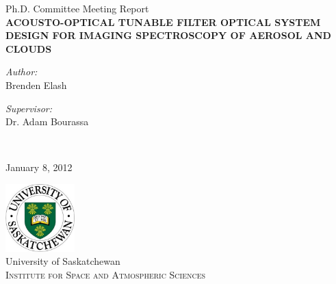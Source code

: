 \begin{titlepage}

\begin{center}

\textup{\large Ph.D. Committee Meeting Report}\\[1.0cm]

\uppercase{\large \textbf{Acousto-Optical Tunable Filter Optical System Design for Imaging Spectroscopy of Aerosol and Clouds}}\\[5.0cm]

\begin{minipage}{0.4\textwidth}
\begin{flushleft}
\emph{Author:}\\
Brenden Elash
\end{flushleft}
\end{minipage}
\begin{minipage}{0.4\textwidth}
\begin{flushright}
\emph{Supervisor:}\\
Dr. Adam Bourassa
\end{flushright}
\end{minipage}\\[2.0cm]

\begin{center}
\textup{\large January 8, 2012}
\end{center}

\vfill

\includegraphics[width=0.2\textwidth]{./Images/UofSLogo}\\[1.0cm]
\LARGE{University of Saskatchewan}\\
\normalsize
\textsc{Institute for Space and Atmospheric Sciences}\\
\vspace{0.5cm}

\end{center}

\end{titlepage}
